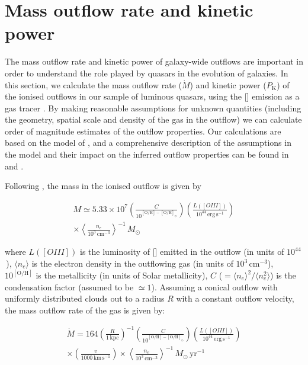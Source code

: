 \section{Mass outflow rate and kinetic power}

The mass outflow rate and kinetic power of galaxy-wide outflows are important in order to understand the role played by quasars in the evolution of galaxies. 
In this section, we calculate the mass outflow rate ($\dot{M}$) and kinetic power ($P_{\text{K}}$) of the ionised outflows in our sample of luminous quasars, using the [] emission as a gas tracer \citep[e.g.][]{harrison12,cano-diaz12,liu13,brusa15,carniani15,bischetti16,kakkad16}.  
By making reasonable assumptions for unknown quantities (including the geometry, spatial scale and density of the gas in the outflow) we can calculate order of magnitude estimates of the outflow properties.
Our calculations are based on the model of \citet{cano-diaz12}, and a comprehensive description of the assumptions in the model and their impact on the inferred outflow properties can be found in \citet{cano-diaz12} and \citet{kakkad16}. 

Following \citet{cano-diaz12}, the mass in the ionised outflow is given by 

\begingroup\makeatletter{}\check@mathfonts
\begin{eqnarray}
M \simeq 5.33 \times 10^7 \left( \frac{C}{10^{[\text{O/H}] - [\text{O/H}]_\odot}} \right) \left( \frac{L([OIII])}{10^{44}\, \text{erg}\,\text{s}^{-1}}\right) \nonumber \\ \times \left\langle \frac{n_e}{10^3\, \text{cm}^{-3}} \right\rangle^{-1} \, M_\odot
\end{eqnarray}
\endgroup

\noindent where $L([OIII])$ is the luminosity of [] emitted in the outflow (in units of $10^{44}$\,\ergs), $\langle n_e \rangle$ is the electron density in the outflowing gas (in units of $10^3$\,cm$^{-3}$), $10^{[\text{O/H}]}$ is the metallicity (in units of Solar metallicity), $C$ ($=\langle n_e \rangle ^2 / \langle n_e^2\rangle$) is the condensation factor (assumed to be $\simeq1$). 
Assuming a conical outflow with uniformly distributed clouds out to a radius $R$ with a constant outflow velocity, the mass outflow rate of the gas is given by: 

\begingroup\makeatletter{}\check@mathfonts
\begin{eqnarray}
\dot{M} = 164 \left( \frac{R}{1\,\text{kpc}} \right)^{-1} \left( \frac{C}{10^{[\text{O/H}] - [\text{O/H}]_\odot}} \right) \left( \frac{L([OIII])}{10^{44}\, \text{erg}\,\text{s}^{-1}}\right) \nonumber \\ \times \left( \frac{v}{1000\,\text{km}\,\text{s}^{-1}}\right) \times \left\langle  \frac{n_e}{10^3\, \text{cm}^{-3}} \right\rangle^{-1} \, M_\odot \, \text{yr}^{-1}
\end{eqnarray}
\endgroup

